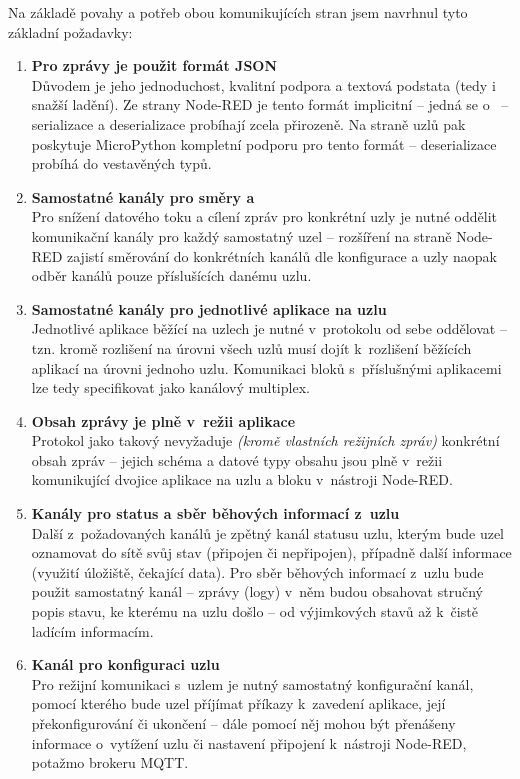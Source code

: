 Na základě povahy a potřeb obou komunikujících stran jsem navrhnul tyto základní požadavky:
\begin{enumerate}
    \item \textbf{Pro zprávy je použit formát JSON} \\
    Důvodem je jeho jednoduchost, kvalitní podpora a textová podstata (tedy i snažší ladění).
    Ze strany Node-RED je tento formát implicitní -- jedná se o~ -- serializace a
    deserializace probíhají zcela přirozeně.
    Na straně uzlů pak poskytuje MicroPython kompletní podporu pro tento formát -- deserializace probíhá do
    vestavěných typů.

    \item \textbf{Samostatné kanály pro směry  a } \\
    Pro snížení datového toku a cílení zpráv pro konkrétní uzly je nutné oddělit komunikační kanály pro každý
    samostatný uzel -- rozšíření na straně Node-RED zajistí směrování do konkrétních kanálů dle konfigurace a uzly
    naopak odběr kanálů pouze příslušících danému uzlu.

    \item \textbf{Samostatné kanály pro jednotlivé aplikace na uzlu} \\
    Jednotlivé aplikace běžící na uzlech je nutné v~protokolu od sebe oddělovat -- tzn. kromě rozlišení na úrovni
    všech uzlů musí dojít k~rozlišení běžících aplikací na úrovni jednoho uzlu.
    Komunikaci bloků s~příslušnými aplikacemi lze tedy specifikovat jako kanálový multiplex.

    \item \textbf{Obsah zprávy je plně v~režii aplikace} \\
    Protokol jako takový nevyžaduje \emph{(kromě vlastních režijních zpráv)} konkrétní obsah zpráv -- jejich schéma a
    datové typy obsahu jsou plně v~režii komunikující dvojice aplikace na uzlu a bloku v~nástroji Node-RED.

    \item \textbf{Kanály pro status a sběr běhových informací z~uzlu} \\
    Další z~požadovaných kanálů je zpětný kanál statusu uzlu, kterým bude uzel oznamovat do sítě svůj stav (připojen či
    nepřipojen), případně další informace (využití úložiště, čekající data).
    Pro sběr běhových informací z~uzlu bude použit samostatný kanál -- zprávy (logy) v~něm budou obsahovat stručný
    popis stavu, ke kterému na uzlu došlo -- od výjimkových stavů až k~čistě ladícím informacím.

    \item \textbf{Kanál pro konfiguraci uzlu} \\
    Pro režijní komunikaci s~uzlem je nutný samostatný konfigurační kanál, pomocí kterého bude uzel příjímat příkazy
    k~zavedení aplikace, její překonfigurování či ukončení -- dále pomocí něj mohou být přenášeny informace o~vytížení
    uzlu či nastavení připojení k~nástroji Node-RED, potažmo brokeru MQTT.
\end{enumerate}

